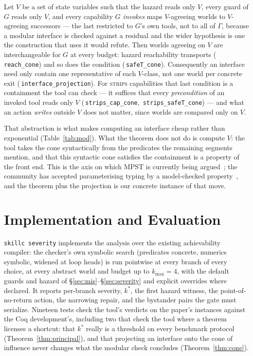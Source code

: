 \documentclass[a4paper,UKenglish,cleveref,autoref,thm-restate,anonymous]{lipics-v2021}
\newcommand{\coqok}[1]{\textcolor{okgreen}{\ding{51}}\,\texttt{\small #1}}
\newcommand{\kstar}{k^{*}}
\begin{document}
\begin{theorem}\label{thm:cone}
Let $V$ be a set of state variables such that the hazard reads only $V$, every
guard of $G$ reads only $V$, and every capability \emph{$G$ invokes} maps
$V$-agreeing worlds to $V$-agreeing successors --- the last restricted to $G$'s
own tools, not to all of $\Gamma$, because a modular interface is checked
against a residual and the wider hypothesis is one the construction that uses
it would refute. Then worlds agreeing on $V$ are interchangeable for $G$
at every budget: hazard reachability transports (\coqok{reach\_cone}) and so
does the condition (\coqok{safeT\_cone}). Consequently an interface need only
contain one representative of each $V$-class, not one world per concrete exit
(\coqok{interface\_projection}). For \textsc{strips} capabilities that last
condition is a containment the tool can check --- it suffices that every
\emph{precondition} of an invoked tool reads only $V$
(\coqok{strips\_cap\_cone}, \coqok{strips\_safeT\_cone}) --- and what an action
\emph{writes} outside $V$ does not matter, since worlds are compared only on
$V$.
\end{theorem}

That abstraction is what makes computing an interface cheap rather than
exponential (Table~\ref{tab:mod}). What the theorem does not do is compute $V$:
the tool takes the cone syntactically from the predicates the remaining
segments mention, and that this syntactic cone satisfies the containment is a
property of the front end. This is the axis on
which MPST is currently being argued~\cite{castro-popl26}; the community
has accepted parameterising typing by a model-checked
property~\cite{barwell-concur22,barwell-ecoop23}, and the theorem plus the
projection is our concrete instance of that move.

\section{Implementation and Evaluation}\label{sec:eval}

\texttt{skillc severity} implements the analysis over the existing
achievability compiler: the checker's own symbolic search (predicates
concrete, numerics symbolic, widened at loop heads) is run pointwise at every
branch of every choice, at every abstract world and budget up to
$k_{\max}=4$, with the default guards and hazard of
\S\ref{sec:mis}--\S\ref{sec:severity} and explicit overrides where declared.
It reports per-branch severity, $\kstar$, the first hazard witness, the
point-of-no-return action, the narrowing repair, and the bystander pairs the gate must serialize. Nineteen tests check the
tool's verdicts on the paper's instances against the Coq development's,
including two that check the tool where a theorem licenses a shortcut: that
$\kstar$ really is a threshold on every benchmark protocol
(Theorem~\ref{thm:principal}), and that projecting an interface onto the cone
of influence never changes what the modular check concludes
(Theorem~\ref{thm:cone}).
\end{document}
